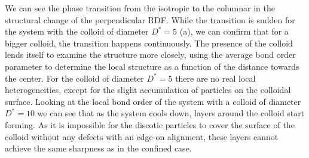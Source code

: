 We can see the phase transition from the isotropic to the columnar in the structural change of the perpendicular RDF. While the transition is sudden for the system with the colloid of diameter $D^*=5$ (a), we can confirm that for a bigger colloid, the transition happens continuously.
The presence of the colloid lends itself to examine the structure more closely, using the average bond order parameter to determine the local structure as a function of the distance towards the center. For the colloid of diameter $D^*=5$ there are no real local heterogeneities, except for the slight accumulation of particles on the colloidal surface.
Looking at the local bond order of the system with a colloid of diameter $D^*=10$ we can see that as the system cools down, layers around the colloid start forming. As it is impossible for the discotic particles to cover the surface of the colloid without any defects with an edge-on alignment, these layers cannot achieve the same sharpness as in the confined case.


